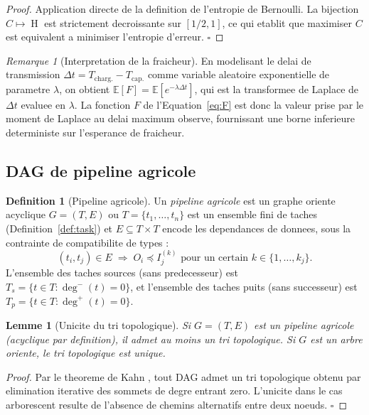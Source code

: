 \documentclass[12pt,a4paper]{article}
\theoremstyle{plain}
\newtheorem{lemma}[theorem]{Lemme}
\theoremstyle{definition}
\newtheorem{definition}[theorem]{Definition}
\theoremstyle{remark}
\newtheorem{remark}[theorem]{Remarque}
\DeclareMathOperator{\ent}{H}
\newcommand{\E}{\mathbb{E}}
\begin{document}
	\begin{proof}
		Application directe de la definition de l'entropie de Bernoulli.
		La bijection $C \mapsto \ent$ est strictement decroissante sur
		$[1/2, 1]$, ce qui etablit que maximiser $C$ est equivalent a
		minimiser l'entropie d'erreur. \hfill$\square$
	\end{proof}
	
	\begin{remark}[Interpretation de la fraicheur]
		En modelisant le delai de transmission $\Delta t = T_{\text{charg.}} -
		T_{\text{cap.}}$ comme variable aleatoire exponentielle de parametre
		$\lambda$, on obtient $\E[F] = \E[e^{-\lambda\Delta t}]$, qui est
		la transformee de Laplace de $\Delta t$ evaluee en $\lambda$.
		La fonction $F$ de l'Equation~\eqref{eq:F} est donc la valeur prise
		par le moment de Laplace au delai maximum observe, fournissant une
		borne inferieure deterministe sur l'esperance de fraicheur.
	\end{remark}
	
	\subsection{DAG de pipeline agricole}
	\label{subsec:dag}
	
	\begin{definition}[Pipeline agricole]
		\label{def:pipeline}
		Un \emph{pipeline agricole} est un graphe oriente acyclique
		$G = (T, E)$ ou $T = \{t_1,\ldots,t_n\}$ est un ensemble fini de
		taches (Definition~\ref{def:task}) et $E \subseteq T \times T$
		encode les dependances de donnees, sous la contrainte de compatibilite
		de types :
		\[
		(t_i, t_j) \in E \;\Rightarrow\;
		O_i \preceq I_j^{(k)} \text{ pour un certain } k \in \{1,\ldots,k_j\}.
		\]
		L'ensemble des taches sources (sans predecesseur) est
		$T_s = \{t \in T : \deg^{-}(t) = 0\}$, et l'ensemble des taches
		puits (sans successeur) est
		$T_p = \{t \in T : \deg^{+}(t) = 0\}$.
	\end{definition}
	
	\begin{lemma}[Unicite du tri topologique]
		\label{lem:topo}
		Si $G=(T,E)$ est un pipeline agricole (acyclique par definition),
		il admet au moins un tri topologique. Si $G$ est un arbre oriente,
		le tri topologique est unique.
	\end{lemma}
	
	\begin{proof}
		Par le theoreme de Kahn \cite{kahn_topological}, tout DAG admet un
		tri topologique obtenu par elimination iterative des sommets de
		degre entrant zero. L'unicite dans le cas arborescent resulte de
		l'absence de chemins alternatifs entre deux noeuds. \hfill$\square$
	\end{proof}
	
\end{document}
